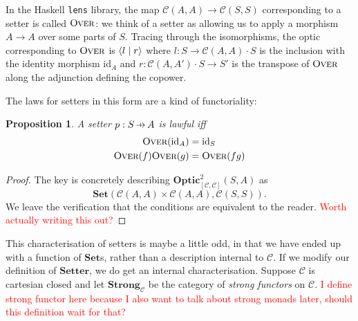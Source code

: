 \documentclass[11pt,letterpaper]{article}
\theoremstyle{plain}
\newtheorem{proposition}[theorem]{Proposition}
\theoremstyle{definition}
\newcommand{\C}{\mathscr{C}}
\newcommand{\lenslib}{\texttt{lens}}
\newcommand{\Set}{\mathbf{Set}}
\newcommand{\Strong}{\mathbf{Strong}}
\newcommand{\Twoptic}{\mathbf{Optic}^2}
\newcommand{\Setter}{\mathbf{Setter}}
\newcommand{\id}{\mathrm{id}}
\newcommand{\rep}[2]{{\ensuremath \left\langle #1 \mid #2 \right\rangle}}
\newcommand{\fover}{\textsc{Over}}
\newcommand{\hto}{\ensuremath{\,\mathaccent\shortmid\rightarrow\,}}
\newcommand{\todo}[1]{\textcolor{red}{\small #1}}
\begin{document}
In the Haskell \lenslib{} library, the map $\C(A, A) \to \C(S,S)$ corresponding to a setter is called $\fover$: we think of a setter as allowing us to apply a morphism $A \to A$ over some parts of $S$. Tracing through the isomorphisms, the optic corresponding to $\fover$ is $\rep{l}{r}$ where $l : S \to \C(A, A) \cdot S$ is the inclusion with the identity morphism $\id_A$ and $r : \C(A, A') \cdot S \to S'$ is the transpose of $\fover$ along the adjunction defining the copower.

The laws for setters in this form are a kind of functoriality:

\begin{proposition}
A setter $p : S \hto A$ is lawful iff
\begin{align*}
\fover(\id_A) &= \id_S \\
\fover(f)\fover(g)&= \fover(fg)
\end{align*}
\end{proposition}
\begin{proof}
The key is concretely describing $\Twoptic_{[\C, \C]}(S, A)$ as \[ \Set( \C(A, A) \times \C(A, A), \C(S, S) ).\] We leave the verification that the conditions are equivalent to the reader. \todo{Worth actually writing this out?}
\end{proof}

This characterisation of setters is maybe a little odd, in that we have ended up with a function of $\Set$s, rather than a description internal to $\C$. If we modify our definition of $\Setter$, we do get an internal characterisation. Suppose $\C$ is cartesian closed and let $\Strong_\C$ be the category of \emph{strong functors} on $\C$. \todo{I define strong functor here because I also want to talk about strong monads later, should this definition wait for that?}
\end{document}

